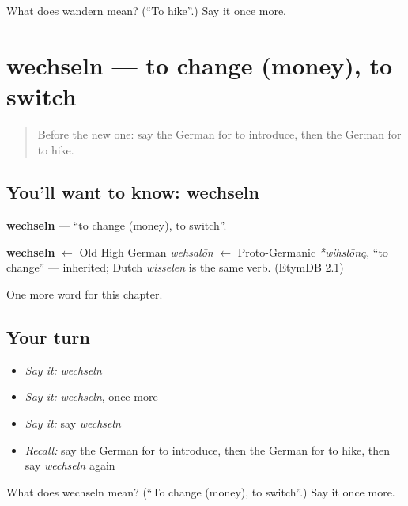 \begin{tcolorbox}[breakable,colback=teal!4,colframe=teal!35!black,title={Before you move on}]
What does wandern mean? (\textquotedblleft{}To hike\textquotedblright{}.) Say it once more.
\end{tcolorbox}
\section[wechseln]{wechseln — to change (money), to switch}

\label{lesson:GE-C153-wechseln}



\begin{quote}
Before the new one: say the German for to introduce, then the German for to hike.
\end{quote}

\subsection*{You'll want to know: wechseln}
\textbf{wechseln} — \textquotedblleft{}to change (money), to switch\textquotedblright{}.

\begin{cousinweb}
\textbf{wechseln} $\leftarrow$ Old High German \emph{wehsalōn} $\leftarrow$ Proto-Germanic \emph{*wihslōną}, \textquotedblleft{}to change\textquotedblright{} — inherited; Dutch \emph{wisselen} is the same verb. (EtymDB 2.1)
\end{cousinweb}

\begin{grammarlens}[title={What you've built}]
One more word for this chapter.
\end{grammarlens}

\subsection*{Your turn}
\begin{itemize}
\raggedright
  \item \emph{Say it:} \emph{wechseln}
  \item \emph{Say it:} \emph{wechseln}, once more
  \item \emph{Say it:} say \emph{wechseln}
  \item \emph{Recall:} say the German for to introduce, then the German for to hike, then say \emph{wechseln} again
\end{itemize}

\begin{tcolorbox}[breakable,colback=teal!4,colframe=teal!35!black,title={Before you move on}]
What does wechseln mean? (\textquotedblleft{}To change (money), to switch\textquotedblright{}.) Say it once more.
\end{tcolorbox}
